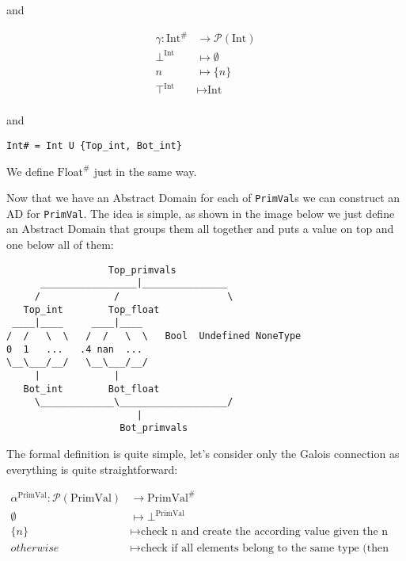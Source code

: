 and

\begin{align*}
  \gamma \colon \text{Int}^{\#} &\to \mathcal{P}(\text{Int}) \\
  \bot^{\text{Int}} &\mapsto \emptyset \\
  n &\mapsto \{n\} \\
  \top^{\text{Int}} &\mapsto \text{Int} \\
\end{align*}

and

\begin{verbatim}
Int# = Int U {Top_int, Bot_int}
\end{verbatim}

We define \(\text{Float}^{\#}\) just in the same way.

Now that we have an Abstract Domain for each of \texttt{PrimVal}s we can
construct an AD for \texttt{PrimVal}. The idea is simple, as shown in
the image below we just define an Abstract Domain that groups them all
together and puts a value on top and one below all of them:

{}

\begin{verbatim}
                  Top_primvals
      _________________|_______________
     /             /                   \
   Top_int        Top_float
 ____|____     ____|____
/  /   \  \   /  /   \  \   Bool  Undefined NoneType
0  1   ...   .4 nan  ...
\__\___/__/   \__\___/__/
     |             |
   Bot_int        Bot_float
     \_____________\___________________/
                       |
                    Bot_primvals
\end{verbatim}

The formal definition is quite simple, let's consider only the Galois
connection as everything is quite straightforward:

{}

\begin{align*}
  \alpha^{\text{PrimVal}} \colon \mathcal{P}(\text{PrimVal}) &\to \text{PrimVal}^{\#} \\
  \emptyset &\mapsto \bot^{\text{PrimVal}} \\
  \{n\} &\mapsto \text{check n and create the according value given the n type} \\
  otherwise &\mapsto \text{check if all elements belong to the same type (then same alpha)
  otherwise Top primval} \\
\end{align*}

